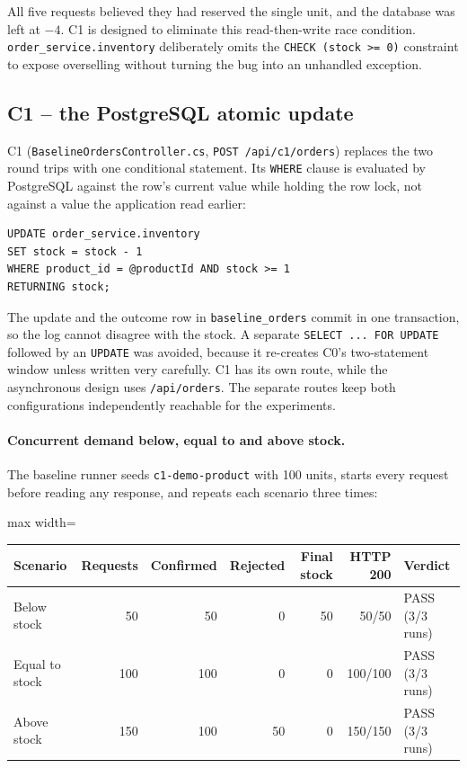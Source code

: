 \documentclass[a4paper]{report}
\begin{document}
All five requests believed they had reserved the single unit, and the
database was left at \(-4\). C1 is designed to eliminate this read-then-write
race condition. \texttt{order\_service.inventory} deliberately omits the
\texttt{CHECK (stock >= 0)} constraint to expose overselling without turning
the bug into an unhandled exception.

\subsection{C1 -- the PostgreSQL atomic update}

C1 (\texttt{BaselineOrdersController.cs},
\texttt{POST /api/c1/orders}) replaces the two round trips with one
conditional statement. Its \texttt{WHERE} clause is evaluated by PostgreSQL
against the row's current value while holding the row lock, not against a
value the application read earlier:

\begin{Verbatim}[breaklines=true,breakanywhere=true,fontsize=\footnotesize]
UPDATE order_service.inventory
SET stock = stock - 1
WHERE product_id = @productId AND stock >= 1
RETURNING stock;
\end{Verbatim}

The update and the outcome row in \texttt{baseline\_orders} commit in one
transaction, so the log cannot disagree with the stock. A separate
\texttt{SELECT ... FOR UPDATE}~\cite{pg-select} followed by an \texttt{UPDATE} was avoided,
because it re-creates C0's two-statement window unless written very carefully.
C1 has its own route, while the asynchronous design uses \texttt{/api/orders}.
The separate routes keep both configurations independently reachable for the
experiments.

\paragraph{Concurrent demand below, equal to and above stock.}
The baseline runner seeds \texttt{c1-demo-product} with 100
units, starts every request before reading any response, and repeats each
scenario three times:

\begin{center}
\small
\setlength{\tabcolsep}{3.4pt}
\begin{adjustbox}{max width=\linewidth}
\begin{tabular}{@{}lrrrrrl@{}}
\toprule
Scenario & Requests & Confirmed & Rejected & Final stock & HTTP 200 & Verdict \\
\midrule
Below stock & 50 & 50 & 0 & 50 & 50/50 & PASS (3/3 runs) \\
Equal to stock & 100 & 100 & 0 & 0 & 100/100 & PASS (3/3 runs) \\
Above stock & 150 & 100 & 50 & 0 & 150/150 & PASS (3/3 runs) \\
\bottomrule
\end{tabular}
\end{adjustbox}
\end{center}
\end{document}
